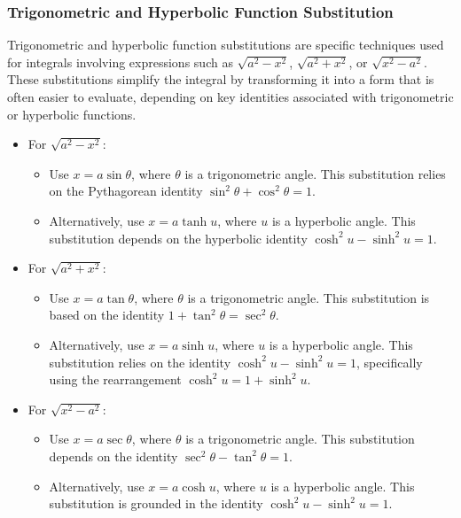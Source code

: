 \subsubsection{Trigonometric and Hyperbolic Function Substitution}

\begin{definition}
Trigonometric and hyperbolic function substitutions are specific techniques used for integrals involving expressions such as $\sqrt{a^2 - x^2}$, $\sqrt{a^2 + x^2}$, or $\sqrt{x^2 - a^2}$. These substitutions simplify the integral by transforming it into a form that is often easier to evaluate, depending on key identities associated with trigonometric or hyperbolic functions.

\begin{itemize}
    \item For $\sqrt{a^2 - x^2}$:
    \begin{itemize}
        \item Use $x = a\sin\theta$, where $\theta$ is a trigonometric angle. This substitution relies on the Pythagorean identity $\sin^2\theta + \cos^2\theta = 1$.
        \item Alternatively, use $x = a\tanh u$, where $u$ is a hyperbolic angle. This substitution depends on the hyperbolic identity $\cosh^2 u - \sinh^2 u = 1$.
    \end{itemize}
    
    \item For $\sqrt{a^2 + x^2}$:
    \begin{itemize}
        \item Use $x = a\tan\theta$, where $\theta$ is a trigonometric angle. This substitution is based on the identity $1 + \tan^2\theta = \sec^2\theta$.
        \item Alternatively, use $x = a\sinh u$, where $u$ is a hyperbolic angle. This substitution relies on the identity $\cosh^2 u - \sinh^2 u = 1$, specifically using the rearrangement $\cosh^2 u = 1 + \sinh^2 u$.
    \end{itemize}
    
    \item For $\sqrt{x^2 - a^2}$:
    \begin{itemize}
        \item Use $x = a\sec\theta$, where $\theta$ is a trigonometric angle. This substitution depends on the identity $\sec^2\theta - \tan^2\theta = 1$.
        \item Alternatively, use $x = a\cosh u$, where $u$ is a hyperbolic angle. This substitution is grounded in the identity $\cosh^2 u - \sinh^2 u = 1$.
    \end{itemize}
\end{itemize}
\end{definition}


